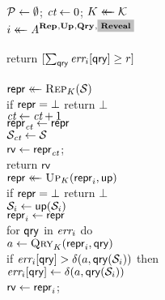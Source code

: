 \begin{figure*}[t]
{
  \\[2pt]
    $\setP \gets \emptyset$; $\ct \gets 0$; $\key \getsr \keys$\\
    $i \getsr \advA^{\REPO,\UPO,\QRYO,\highlighto{\REVO}}$\\
     \\[2.0pt]
    return $[\sum_\qry \err_i[\qry] \geq r]$
  \\[8pt]
  \vspace{-4pt}
}
{
  \oraclev{$\REPO(\col)$}\\[2pt]
    $\pub \getsr \Rep_\key(\col)$\\
    if $\pub = \bot$ return $\bot$\\
    $\ct\gets\ct+1$ \\
    $\pub_\ct \gets \pub$\\
    $\col_\ct \gets \col$\\
    $\mathsf{rv} \gets \pub_\ct$; \\
    return $\mathsf{rv}$
}
{
  \\[2pt]
    $\pub \getsr \Up_\key(\pub_i, \up)$\\
    if $\pub = \bot$ return $\bot$\\
    $\col_i \gets \up(\col_i)$\\
    $\pub_i \gets \pub$\\
    for $\qry$ in $\err_i$ do\\
    \tab $a \gets \Qry_K(\pub_i, \qry)$\\
    \tab if $\err_i[\qry] > \delta(a,\qry(\col_i))$ then\\
    \tab\tab$\err_i[\qry] \gets \delta(a,\qry(\col_i))$\\
    $\mathsf{rv} \gets \pub_i$; \\
}
\end{figure*}
